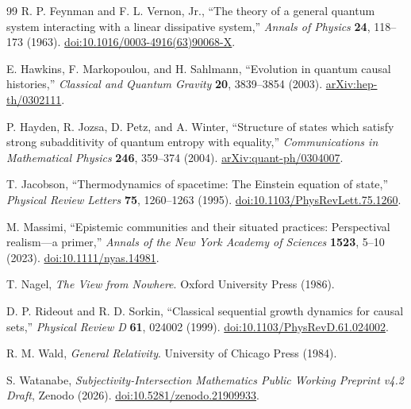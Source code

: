 \documentclass[11pt]{article}
\theoremstyle{definition}
\theoremstyle{remark}
\begin{document}
\begin{thebibliography}{99}
R. P. Feynman and F. L. Vernon, Jr., ``The theory of a general quantum system interacting with a linear dissipative system,'' \emph{Annals of Physics} \textbf{24}, 118--173 (1963). \href{https://doi.org/10.1016/0003-4916(63)90068-X}{doi:10.1016/0003-4916(63)90068-X}.

E. Hawkins, F. Markopoulou, and H. Sahlmann, ``Evolution in quantum causal histories,'' \emph{Classical and Quantum Gravity} \textbf{20}, 3839--3854 (2003). \href{https://arxiv.org/abs/hep-th/0302111}{arXiv:hep-th/0302111}.

P. Hayden, R. Jozsa, D. Petz, and A. Winter, ``Structure of states which satisfy strong subadditivity of quantum entropy with equality,'' \emph{Communications in Mathematical Physics} \textbf{246}, 359--374 (2004). \href{https://arxiv.org/abs/quant-ph/0304007}{arXiv:quant-ph/0304007}.

T. Jacobson, ``Thermodynamics of spacetime: The Einstein equation of state,'' \emph{Physical Review Letters} \textbf{75}, 1260--1263 (1995). \href{https://doi.org/10.1103/PhysRevLett.75.1260}{doi:10.1103/PhysRevLett.75.1260}.

M. Massimi, ``Epistemic communities and their situated practices: Perspectival realism---a primer,'' \emph{Annals of the New York Academy of Sciences} \textbf{1523}, 5--10 (2023). \href{https://doi.org/10.1111/nyas.14981}{doi:10.1111/nyas.14981}.

T. Nagel, \emph{The View from Nowhere}. Oxford University Press (1986).

D. P. Rideout and R. D. Sorkin, ``Classical sequential growth dynamics for causal sets,'' \emph{Physical Review D} \textbf{61}, 024002 (1999). \href{https://doi.org/10.1103/PhysRevD.61.024002}{doi:10.1103/PhysRevD.61.024002}.

R. M. Wald, \emph{General Relativity}. University of Chicago Press (1984).

S. Watanabe, \emph{Subjectivity-Intersection Mathematics Public Working Preprint v4.2 Draft}, Zenodo (2026). \href{https://doi.org/10.5281/zenodo.21909933}{doi:10.5281/zenodo.21909933}.

\end{thebibliography}
\end{document}

